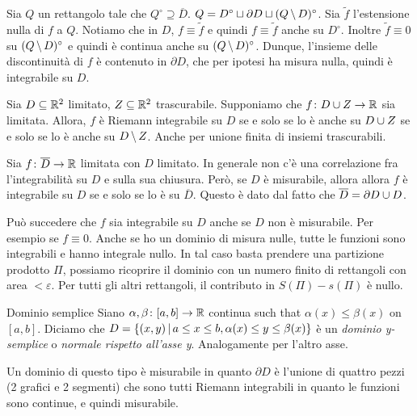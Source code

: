 \documentclass[a4paper]{article}
\begin{document}
\begin{snippetproof}{}
    Sia \(Q\) un rettangolo tale che \(Q^\circ \supseteq \overline{D}\).
    \(Q = D^\circ \sqcup \partial D \sqcup (Q \,\backslash\, D)^\circ\).
    Sia \(\tilde f\) l'estensione nulla di \(f\) a \(Q\).
    Notiamo che in \(D\), \(f \equiv \tilde f\) e quindi
    \(f \equiv \tilde f\) anche su \(D^\circ\).
    Inoltre \(\tilde f \equiv 0\) su \((Q \,\backslash\, D)^\circ\) e quindi è continua anche su \((Q \,\backslash\, D)^\circ\).
    Dunque, l'insieme delle discontinuità di \(f\) è contenuto in \(\partial D\), che per ipotesi ha misura nulla,
    quindi è integrabile su \(D\).
\end{snippetproof}

Sia \(D \subseteq \mathbb{R}^2\) limitato, \(Z \subseteq \mathbb{R}^2\) trascurabile.
Supponiamo che \(f \colon D \cup Z \to \mathbb{R}\) sia limitata.
Allora, \(f\) è Riemann integrabile su \(D\) se e solo se lo è anche su \(D \cup Z\)
se e solo se lo è anche su \(D \,\backslash\, Z\). Anche per unione finita di insiemi trascurabili.

Sia \(f \colon \overline D \to \mathbb{R}\) limitata con \(D\) limitato.
In generale non c'è una correlazione fra l'integrabilità su \(D\) e sulla sua chiusura.
Però, se \(D\) è misurabile, allora
allora \(f\) è integrabile su \(D\) se e solo se lo è su \(\overline{D}\).
Questo è dato dal fatto che \(\overline D = \partial D \cup D\).

Può succedere che \(f\) sia integrabile su \(D\) anche se \(D\) non è misurabile.
Per esempio se \(f \equiv 0\).
Anche se ho un dominio di misura nulle, tutte le funzioni sono integrabili e hanno integrale nullo.
In tal caso basta prendere una partizione prodotto \(\Pi\), possiamo ricoprire
il dominio con un numero finito di rettangoli con area \(<\varepsilon\).
Per tutti gli altri rettangoli, il contributo in \(S(\Pi) - s(\Pi)\) è nullo.

\begin{snippetdefinition}{Dominio semplice}
    Siano \(\alpha, \beta \colon [a,b] \to \mathbb{R}\) continua
    such that \(\alpha(x) \leq \beta(x)\) on \([a,b]\).
    Diciamo che \(D = \{(x,y) \,|\, a \leq x \leq b, \alpha(x) \leq y \leq \beta(x)\}\)
    è un \emph{dominio y-semplice} o \emph{normale rispetto all'asse y}.
    Analogamente per l'altro asse.
\end{snippetdefinition}

Un dominio di questo tipo è misurabile in quanto \(\partial D\) è l'unione di quattro
pezzi (2 grafici e 2 segmenti) che sono tutti Riemann integrabili in quanto
le funzioni sono continue, e quindi misurabile.
\end{document}
